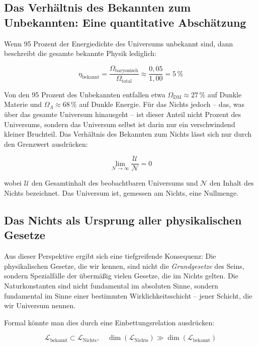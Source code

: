 ﻿\documentclass[12pt,a4paper]{report}
\begin{document}
\subsection{Das Verhältnis des Bekannten zum Unbekannten: Eine quantitative Abschätzung}

Wenn 95 Prozent der Energiedichte des Universums unbekannt sind, dann beschreibt die gesamte bekannte Physik lediglich:

\begin{equation}
	\eta_{\text{bekannt}} = \frac{\Omega_{\text{baryonisch}}}{\Omega_{\text{total}}} \approx \frac{0{,}05}{1{,}00} = 5\,\%
	\label{eq:eta_bekannt}
\end{equation}

Von den 95 Prozent des Unbekannten entfallen etwa $\Omega_{\text{DM}} \approx 27\,\%$ auf Dunkle Materie und $\Omega_{\Lambda} \approx 68\,\%$ auf Dunkle Energie. Für das Nichts jedoch -- das, was über das gesamte Universum hinausgeht -- ist dieser Anteil nicht  Prozent des Universums\grqq{}, sondern das Universum selbst ist darin nur ein verschwindend kleiner Bruchteil. Das Verhältnis des Bekannten zum Nichts lässt sich nur durch den Grenzwert ausdrücken:

\begin{equation}
	\lim_{\mathcal{N} \to \infty} \frac{\mathcal{U}}{\mathcal{N}} = 0
	\label{eq:verhältnis_universum_nichts}
\end{equation}

wobei $\mathcal{U}$ den Gesamtinhalt des beobachtbaren Universums und $\mathcal{N}$ den Inhalt des Nichts bezeichnet. Das Universum ist, gemessen am Nichts, eine Nullmenge.

\subsection{Das Nichts als Ursprung aller physikalischen Gesetze}

Aus dieser Perspektive ergibt sich eine tiefgreifende Konsequenz: Die physikalischen Gesetze, die wir kennen, sind nicht die \emph{Grundgesetze} des Seins, sondern Spezialfälle der übermäßig vielen Gesetze, die im Nichts gelten. Die Naturkonstanten sind nicht \glqq fundamental\grqq{} im absoluten Sinne, sondern \glqq fundamental\grqq{} im Sinne einer bestimmten Wirklichkeitsschicht -- jener Schicht, die wir \glqq Universum\grqq{} nennen.

Formal könnte man dies durch eine Einbettungsrelation ausdrücken:

\begin{equation}
	\mathcal{L}_{\text{bekannt}} \subset \mathcal{L}_{\text{Nichts}}, \quad \dim(\mathcal{L}_{\text{Nichts}}) \gg \dim(\mathcal{L}_{\text{bekannt}})
	\label{eq:einbettung}
\end{equation}
\end{document}
